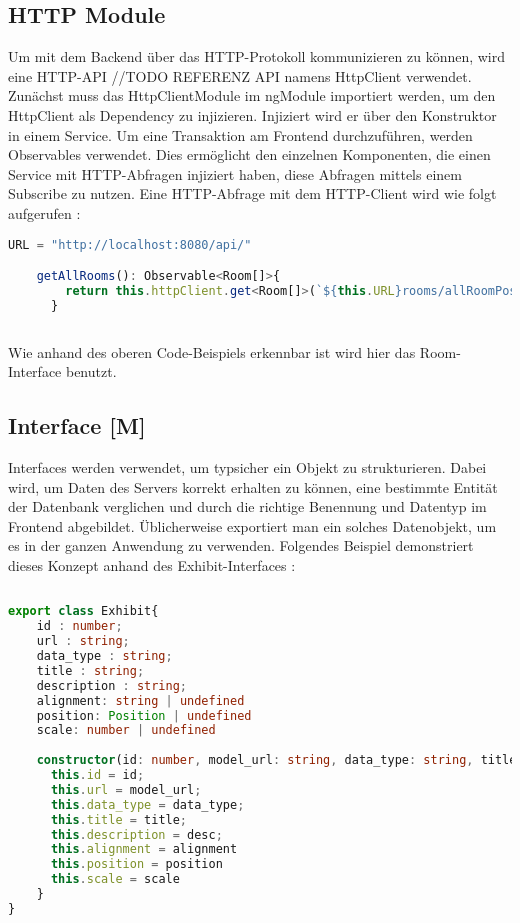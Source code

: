 \subsection{HTTP Module}
Um mit dem Backend über das HTTP-Protokoll kommunizieren zu können, wird eine HTTP-API //TODO REFERENZ API namens HttpClient verwendet. Zunächst muss das HttpClientModule im ngModule importiert werden, um den HttpClient als Dependency zu injizieren. Injiziert wird er über den Konstruktor in einem Service. Um eine Transaktion am Frontend durchzuführen, werden Observables verwendet. Dies ermöglicht den einzelnen Komponenten, die einen Service mit HTTP-Abfragen injiziert haben, diese Abfragen mittels einem Subscribe zu nutzen. Eine HTTP-Abfrage mit dem HTTP-Client wird wie folgt aufgerufen \cite{AngularBuch} \cite{AngularHTTPClient}:

\begin{lstlisting}[caption={HttpClient Abfragen},  language=TypeScript,label=lst:impl:httpclientrequests]   
    URL = "http://localhost:8080/api/"

    getAllRooms(): Observable<Room[]>{
        return this.httpClient.get<Room[]>(`${this.URL}rooms/allRoomPositions`);
      }
    
\end{lstlisting}

Wie anhand des oberen Code-Beispiels erkennbar ist wird hier das Room-Interface benutzt.

\subsection{Interface [M]}

Interfaces werden verwendet, um typsicher ein Objekt zu strukturieren. Dabei wird, um Daten des Servers korrekt erhalten zu können, eine bestimmte Entität der Datenbank verglichen und durch die richtige Benennung und Datentyp im Frontend abgebildet. Üblicherweise exportiert man ein solches Datenobjekt, um es in der ganzen Anwendung zu verwenden. Folgendes Beispiel demonstriert dieses Konzept anhand des Exhibit-Interfaces \cite{AngularBuch}: 

\begin{lstlisting}[caption={Das Datenmodell eines Ausstelungsstückes},  language=TypeScript,label=lst:impl:httpclientrequests]   
  
export class Exhibit{
    id : number;
    url : string;
    data_type : string;
    title : string;
    description : string;
    alignment: string | undefined
    position: Position | undefined
    scale: number | undefined
  
    constructor(id: number, model_url: string, data_type: string, title: string, desc: string, alignment: string | undefined, position: Position | undefined, scale: number | undefined) {
      this.id = id;
      this.url = model_url;
      this.data_type = data_type;
      this.title = title;
      this.description = desc;
      this.alignment = alignment
      this.position = position
      this.scale = scale
    }
}
\end{lstlisting}

